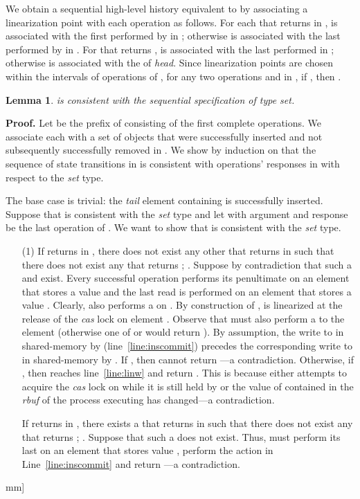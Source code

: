 \documentclass[11pt,pdftex,letterpaper]{article}
\newtheorem{lemma}[theorem]{Lemma}
\newenvironment{proof}[1][Proof]{\noindent\textbf{#1.} }{\hfill \2mm]}
\begin{document}
We obtain a sequential high-level history  equivalent to  by associating a linearization point  
with each operation  as follows.
For each  that returns  in ,  is associated with 
the first  performed by  in ; otherwise
 is associated with the last  performed by  in . For  that returns , 
is associated with the last  performed in ; otherwise  is associated with the  of \emph{head}.
Since linearization points are chosen within the intervals of 
operations of , for any two operations
 and  in , if , then .
\begin{lemma}
\label{lem:rlegal}
 is consistent with the sequential specification of type \textit{set}.
\end{lemma}
\begin{proof}
Let  be the prefix of  consisting of
the first  complete operations. 
We associate each  with a set  of objects that were
successfully inserted and not subsequently successfully removed in .
We show by induction on  that the sequence of state transitions in
 is consistent with operations' responses in  with respect to the \textit{set} type. 

The base case  is trivial: the \textit{tail} element containing
 is successfully inserted.
Suppose that  is consistent with the \emph{set} type and
let  with argument  and response 
be the last operation of .  
We want to show that  is consistent with the \textit{set} type. 
\begin{enumerate}
\item[(1)]
If  returns  in , there does not exist any other  that returns  in  such that there does not exist any  that returns ; .
Suppose by contradiction that such a  and  exist.
Every successful  operation performs its penultimate  on an element  that stores a value  and the last read is performed on an element that stores a value . Clearly,  also performs a  on .
By construction of ,  is linearized at the release of the \emph{cas} lock on element .
Observe that  must also perform a  to the element  (otherwise one of  or  would return ).
By assumption, the write to  in shared-memory by 
(line~\ref{line:inscommit}) precedes the corresponding write to  in
shared-memory by . If , then  cannot return ---a contradiction.
Otherwise, if ,
then  reaches line~\ref{line:linw} and return
. This is because either  attempts to acquire the
\emph{cas} lock on  while it is still held by  or the value
of  contained in the \emph{rbuf} of the process executing 
has changed---a contradiction. 

If  returns  in , there exists a  that returns  in  such that there does not exist any  that returns ; . 
Suppose that such a  does not exist. Thus,  must perform
its last  on an element that stores value , perform
the action in Line~\ref{line:inscommit} and return ---a contradiction.


\end{enumerate}
\end{proof}
\end{document}
